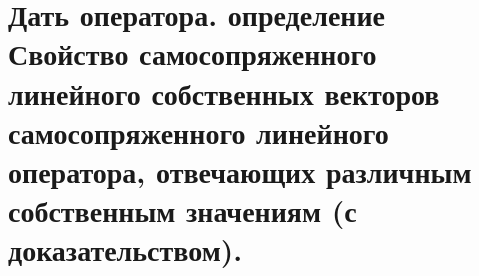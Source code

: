 \section{
    Дать оператора. определение Свойство самосопряженного линейного собственных векторов самосопряженного линейного оператора, отвечающих различным собственным значениям (с доказательством).
}
